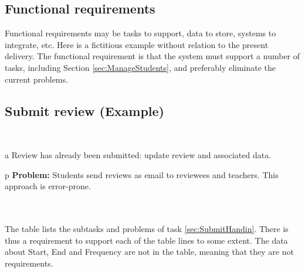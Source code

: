 \documentclass[Main]{subfiles}
\begin{document}
\subsection{Functional requirements}

Functional requirements may be tasks to support, data to store, systems to integrate, etc. 
Here is a fictitious example without relation to the present delivery. 
The functional requirement is that the system must support a number of tasks, including Section \ref{sec:ManageStudents}, and preferably eliminate the current problems.

\subsection{Submit review (Example)}

\colorbox{light-gray}{\begin{minipage}{\textwidth}
\begin{DataIntro}
\end{DataIntro}
\end{minipage}}
\\
\colorbox{light-gray}{\begin{minipage}{\textwidth}
\begin{TaskTable}


\RecordAddi
{a}
{Review has already been submitted: update review and associated data.}{}


\RecordAddi
{p}
{\textbf{Problem:} Students send reviews as email to reviewees and teachers. This approach is error-prone.}{}{}
\end{TaskTable}
\end{minipage}}
\\
\\
The table lists the subtasks and problems of task \ref{sec:SubmitHandin}. 
There is thus a requirement to support each of the table lines to some extent. 
The data about Start, End and Frequency are not in the table, meaning that they are not requirements.
\end{document}
